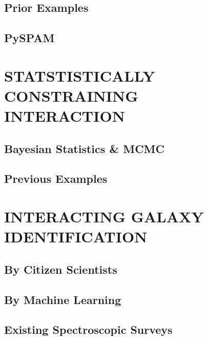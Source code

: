 \subsection{Prior Examples}

\subsection{PySPAM}

\section{STATSTISTICALLY CONSTRAINING INTERACTION}

\subsection{Bayesian Statistics \& MCMC}

\subsection{Previous Examples}

\section{INTERACTING GALAXY IDENTIFICATION}

\subsection{By Citizen Scientists}

\subsection{By Machine Learning}

\subsection{Existing Spectroscopic Surveys}


